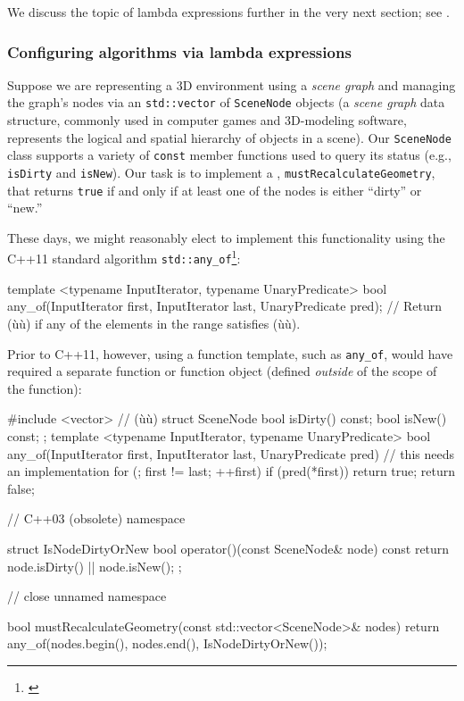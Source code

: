 \noindent We discuss the topic of lambda expressions further in the very next section; see .

\subsubsection[Configuring algorithms via lambda expressions]{Configuring algorithms via lambda expressions}\label{configuring-algorithms-via-lambda-expressions}

Suppose we are representing a 3D environment using a \emph{scene
graph} and managing
the graph's nodes via an \lstinline!std::vector! of \lstinline!SceneNode!
objects (a \emph{scene graph} data structure, commonly
used in computer games and 3D-modeling software, represents the
  logical and spatial hierarchy of objects in a scene). Our \lstinline!SceneNode! class supports a variety of
\lstinline!const! member functions used to query its status (e.g.,
\lstinline!isDirty! and \lstinline!isNew!). Our task is to implement a
, \lstinline!mustRecalculateGeometry!, that
returns \lstinline!true! if and only if at least one of the nodes is either
``dirty'' or ``new.''

These days, we might reasonably elect to implement this functionality
using the C++11 standard algorithm
\lstinline!std::any_of!{\cprotect\footnote{\cite{cpprefa}}}:

\begin{emcppslisting}[emcppsbatch=e4]
template <typename InputIterator, typename UnaryPredicate>
bool any_of(InputIterator first, InputIterator last, UnaryPredicate pred);
    // Return (ù{}ù) if any of the elements in the range satisfies (ù{}ù).
\end{emcppslisting}

\noindent Prior to C++11, however, using a function template, such as
\lstinline!any_of!, would have required a separate function or
function object (defined \emph{outside} of the scope of the function):

\begin{emcppshiddenlisting}[emcppsbatch={e4,e5}]
#include <vector>     // (ù{}ù)
struct SceneNode {
    bool isDirty() const;
    bool isNew() const;
};
template <typename InputIterator, typename UnaryPredicate>
bool any_of(InputIterator first, InputIterator last, UnaryPredicate pred)
{
   // this needs an implementation
   for (; first != last; ++first) {
      if (pred(*first)) {
          return true;
      }
  }
  return false;
}
\end{emcppshiddenlisting}
\begin{emcppslisting}[emcppsbatch=e4]
// C++03 (obsolete)
namespace {

struct IsNodeDirtyOrNew
{
    bool operator()(const SceneNode& node) const
    {
        return node.isDirty() || node.isNew();
    }
};

}  // close unnamed namespace

bool mustRecalculateGeometry(const std::vector<SceneNode>& nodes)
{
    return any_of(nodes.begin(), nodes.end(), IsNodeDirtyOrNew());
}
\end{emcppslisting}

